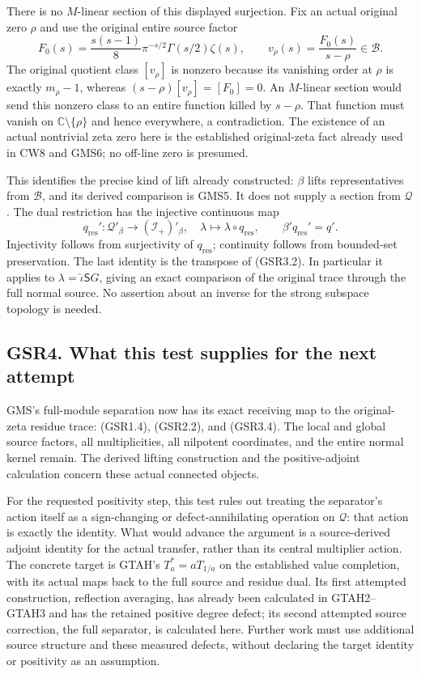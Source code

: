 There is no \(M\)-linear section of this displayed surjection. Fix an
actual original zero \(\rho\) and use the original entire source factor
\[
F_0(s)=\frac{s(s-1)}8\pi^{-s/2}\Gamma(s/2)\zeta(s),
\qquad v_\rho(s)=\frac{F_0(s)}{s-\rho}\in\mathcal B.
\tag{GSR3.3}
\] The original quotient class \([v_\rho]\) is nonzero because its
vanishing order at \(\rho\) is exactly \(m_\rho-1\), whereas
\((s-\rho)[v_\rho]=[F_0]=0\). An \(M\)-linear section would send this
nonzero class to an entire function killed by \(s-\rho\). That function
must vanish on \(\mathbb C\setminus\{\rho\}\) and hence everywhere, a
contradiction. The existence of an actual nontrivial zeta zero here is
the established original-zeta fact already used in CW8 and GMS6; no
off-line zero is presumed.

This identifies the precise kind of lift already constructed: \(\beta\)
lifts representatives from \(\mathcal B\), and its derived comparison is
GMS5. It does not supply a section from \(\mathcal Q\). The dual
restriction has the injective continuous map \[
q_{\mathrm{res}}' :\mathcal Q'_\beta\longrightarrow(\mathcal I_+)'_\beta,
\quad \lambda\longmapsto\lambda\circ q_{\mathrm{res}},
\qquad
\beta' q_{\mathrm{res}}'=q'.
\tag{GSR3.4}
\] Injectivity follows from surjectivity of \(q_{\mathrm{res}}\);
continuity follows from bounded-set preservation. The last identity is
the transpose of (GSR3.2). In particular it applies to
\(\lambda=\widehat\iota\mathsf SG\), giving an exact comparison of the
original trace through the full normal source. No assertion about an
inverse for the strong subspace topology is needed.

\subsection{GSR4. What this test supplies for the next
attempt}\label{gsr4.-what-this-test-supplies-for-the-next-attempt}

GMS's full-module separation now has its exact receiving map to the
original-zeta residue trace: (GSR1.4), (GSR2.2), and (GSR3.4). The local
and global source factors, all multiplicities, all nilpotent
coordinates, and the entire normal kernel remain. The derived lifting
construction and the positive-adjoint calculation concern these actual
connected objects.

For the requested positivity step, this test rules out treating the
separator's action itself as a sign-changing or defect-annihilating
operation on \(\mathcal Q\): that action is exactly the identity. What
would advance the argument is a source-derived adjoint identity for the
actual transfer, rather than its central multiplier action. The concrete
target is GTAH's \(T_a^*=aT_{1/a}\) on the established value completion,
with its actual maps back to the full source and residue dual. Its first
attempted construction, reflection averaging, has already been
calculated in GTAH2--GTAH3 and has the retained positive degree defect;
its second attempted source correction, the full separator, is
calculated here. Further work must use additional source structure and
these measured defects, without declaring the target identity or
positivity as an assumption.

